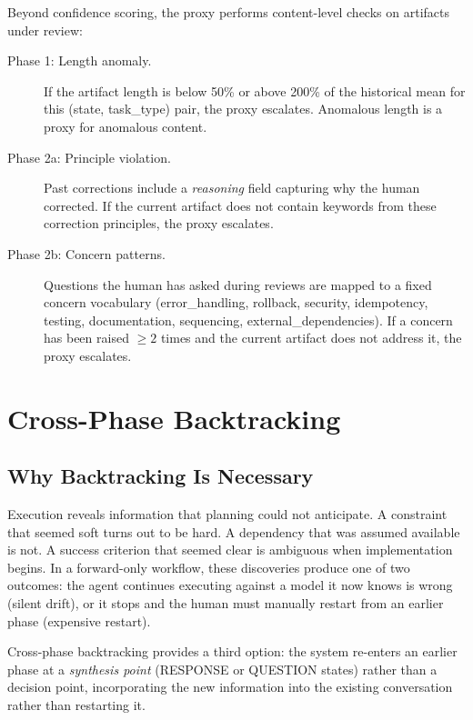 \documentclass[11pt,a4paper]{article}
\begin{document}
Beyond confidence scoring, the proxy performs content-level checks on
artifacts under review:

\begin{description}
    \item[Phase 1: Length anomaly.] If the artifact length is below
    50\% or above 200\% of the historical mean for this (state,
    task\_type) pair, the proxy escalates. Anomalous length is a
    proxy for anomalous content.

    \item[Phase 2a: Principle violation.] Past corrections include
    a \emph{reasoning} field capturing why the human corrected.
    If the current artifact does not contain keywords from these
    correction principles, the proxy escalates.

    \item[Phase 2b: Concern patterns.] Questions the human has asked
    during reviews are mapped to a fixed concern vocabulary
    (error\_handling, rollback, security, idempotency, testing,
    documentation, sequencing, external\_dependencies). If a concern
    has been raised $\geq 2$ times and the current artifact does not
    address it, the proxy escalates.
\end{description}

\section{Cross-Phase Backtracking}
\label{sec:backtracking}

\subsection{Why Backtracking Is Necessary}

Execution reveals information that planning could not anticipate.
A constraint that seemed soft turns out to be hard. A dependency that
was assumed available is not. A success criterion that seemed clear
is ambiguous when implementation begins. In a forward-only workflow,
these discoveries produce one of two outcomes: the agent continues
executing against a model it now knows is wrong (silent drift), or it
stops and the human must manually restart from an earlier phase
(expensive restart).

Cross-phase backtracking provides a third option: the system
re-enters an earlier phase at a \emph{synthesis point} (RESPONSE or
QUESTION states) rather than a decision point, incorporating the
new information into the existing conversation rather than
restarting it.
\end{document}

